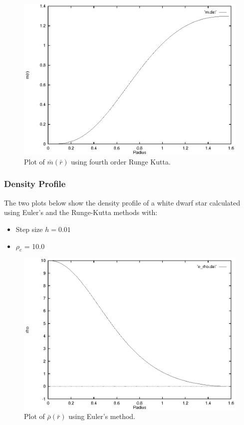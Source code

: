 \documentclass[a4paper]{IEEEtran}
\begin{document}
    \begin{figure} 
    \caption{Plot of $\bar{m}(\bar{r})$ using fourth order Runge Kutta.}
    \label{fig:mass-runge-kutta}  
    \begin{center}
        \includegraphics[width=\columnwidth]{figures/mass-rk-01}
    \end{center}
    \end{figure} 

    \subsubsection{Density Profile}
    The two plots below show the density profile of a white dwarf star 
    calculated using Euler's and the Runge-Kutta methods with:
    \begin{itemize}
        \item Step size $h = 0.01$
        \item $\rho_c$ = 10.0
    \end{itemize}

    \begin{figure}
    \caption{Plot of $\bar{\rho}(\bar{r})$ using Euler's method.}
    \label{fig:density-euler} 
    \begin{center}
        \includegraphics[width=\columnwidth]{figures/density-euler-01}
    \end{center}
    \end{figure} 
\end{document}
